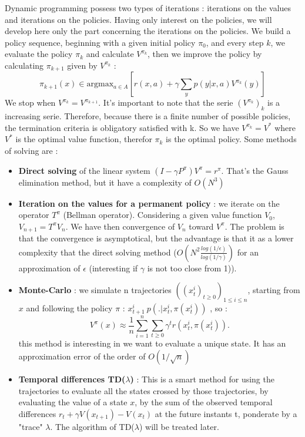 \documentclass[conference]{IEEEtran}
\begin{document}
Dynamic programming possess two types of iterations : iterations on the values and iterations on the policies. Having only interest on the policies, we will develop here only the part concerning the iterations on the policies.
We build a policy sequence, beginning with a given initial policy $\pi_0$, and every step $k$, we evaluate the policy $\pi_k$ and calculate $V^{\pi_k}$, then we improve the policy by calculating $\pi_{k+1}$ given by $V^{\pi_k}$ :
\[ \pi_{k+1}(x) \in \mbox{arg} \mbox{max}_{a \in A}[r(x,a) + \gamma\sum_yp(y|x,a)V^{\pi_k}(y)] 	\]
We stop when $V^{\pi_k} = V^{\pi_{k+1}}$.
It's important to note that the serie $(V^{\pi_k})_k$ is a increasing serie. Therefore, because there is a finite number of possible policies, the termination criteria is obligatory satisfied with k. So we have $V^{\pi_k} = V^*$ where $V^*$ is the optimal value function, therefor $\pi_k$ is the optimal policy.
Some methods of solving are :
\begin{itemize}
 \item \textbf{Direct solving} of the linear system $(I-\gamma P^{\pi})V^{\pi} = r^{\pi}$. That's the Gauss elimination method, but it have a complexity of $O(N^3)$
 \item \textbf{Iteration on the values for a permanent policy} : we iterate on the operator $T^{\pi}$ (Bellman operator). Considering a given value function $V_0$, $V_{n+1} = T^{\pi} V_n$. 
We have then convergence of $V_n$ toward $V^{\pi}$. The problem is that the convergence is asymptotical, but the advantage is that it as a lower complexity that the direct solving method ($O(N^2 \frac{log(1/\epsilon)}{log(1/\gamma)})$ for an approximation of $\epsilon$ (interesting if $\gamma$ is not too close from 1)).
 \item \textbf{Monte-Carlo} : we simulate n trajectories $((x_t^i)_{t \geqslant 0})_{1 \leqslant i \leqslant n}$, starting from $x$ and following the policy $\pi$ : $x_{t+1}^i ~ p(.|x_t^i,\pi(x^i_t))$ , so :
 \begin{equation*}
 V^{\pi}(x) \approx \frac{1}{n} \sum_{i=1}^n \sum_{t \geqslant 0} \gamma^t r(x^i_t, \pi(x^i_t)).
 \end{equation*}
 this method is interesting in we want to evaluate a unique state. It has an approximation error of the order of $O(1/\sqrt{n})$
 \item \textbf{Temporal differences TD($\lambda$)} : This is a smart method for using the trajectories to evaluate all the states crossed by those trajectories, by evaluating the value of a state $x$, by the sum of the observed temporal differences $r_t+\gamma V(x_{t+1}) - V(x_t)$ at the future instants t, ponderate by a "trace" $\lambda$. The algorithm of TD($\lambda$) will be treated later.
\end{itemize}
\end{document}
